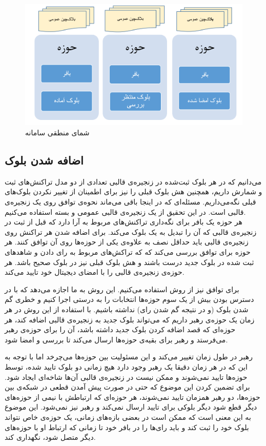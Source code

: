 \begin{figure}[th]
	\centering
	\includegraphics[width=1\linewidth]{blockchain.PNG}
	\caption {شمای منطقی سامانه}
	\label{fig:bigpic}
\end{figure}

\subsection{اضافه شدن بلوک}
می‌دانیم که در هر بلوک ثبت‌شده در زنجیره‌ی قالبی تعدادی از دو مدل تراکنش‌های ثبت و شمارش داریم، همچنین هش بلوک قبلی را نیز برای اطمینان از تغییر نکردن بلوک‌های قبلی نگه‌می‌داریم. مسئله‌ای که در اینجا باقی می‌ماند نحوه‌ی توافق روی یک زنجیره‌ی قالبی است. در این تحقیق از یک زنجیره‌ی قالبی عمومی و بسته استفاده می‌کنیم.
\\
هر حوزه یک بافر برای نگه‌داری تراکنش‌های مربوط به آرا دارد که قبل از ثبت در زنجیره‌ی قالبی که آن را تبدیل به یک بلوک می‌کند. برای اضافه شدن هر تراکنش روی زنجیره‌ی قالبی باید حداقل نصف به علاوه‌ی یکی از حوزه‌ها روی آن توافق کنند. هر حوزه برای توافق بررسی می‌کند که که تراکش‌های مربوط به رای دادن و شاهد‌های ثبت شده در بلوک جدید درست باشند و هش بلوک قبلی نیز در بلوک صحیح باشد. هر حوزه‌ی زنجیره‌ی قالبی را با امضای دیجیتال خود تایید می‌کند. 
\par 
برای توافق نیز از روش  استفاده می‌کنیم. این روش به ما اجازه می‌دهد که با در دسترس بودن بیش از یک سوم حوزه‌ها انتخابات را به درستی اجرا کنیم و خطری گم شدن بلوک (و در نتیجه گم شدن رای) نداشته باشیم. با استفاده از این روش در هر زمان یک حوزه‌ی رهبر داریم که می‌تواند بلوک جدید به زنجیره‌ی قالبی اضافه کند، هر حوزه‌ای که قصد اضافه کردن بلوک جدید داشته باشد، آن را برای حوزه‌ی رهبر می‌فرستد و رهبر برای بقیه‌ی حوزه‌ها ارسال می‌کند تا بررسی و امضا شود. 
\par 
رهبر در طول زمان تغییر می‌کند و این مسئولیت بین حوزه‌ها می‌چرخد اما با توجه  به این که در هر زمان دقیقا یک رهبر وجود دارد هیچ زمانی دو بلوک تایید شده، توسط حوزه‌ها تایید نمی‌شوند و ممکن نیست در زنجیره‌ی قالبی آن‌ها شاخه‌ای ایجاد شود. برای تضمین کردن این موضوع که حتی در صورت پیش آمدن قطعی در شبکه‌ی بین حوزه‌ها، دو رهبر همزمان تایید نمی‌شوند، هر حوزه‌ای که ارتباطش با نیمی از حوزه‌های دیگر قطع شود دیگر بلوکی برای تایید ارسال نمی‌کند و رهبر نیز نمی‌شود. این موضوع به این معنی است که ممکن است در بعضی بازه‌های زمانی، یک حوزه‌ی خاص نتواند بلوک خود را ثبت کند و باید رای‌ها را در بافر خود تا زمانی که ارتباط او با حوزه‌های دیگر متصل شود، نگهداری کند.

